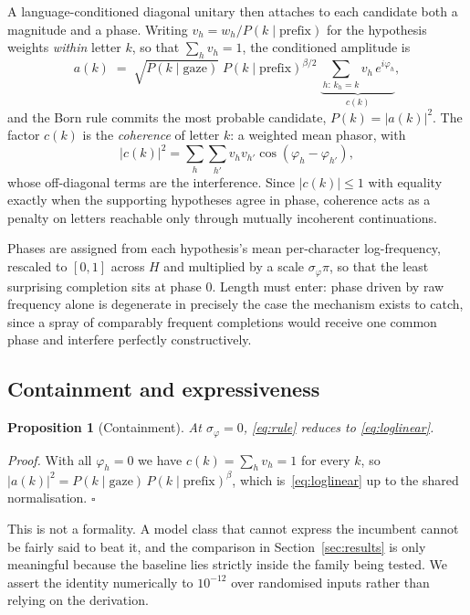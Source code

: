 \documentclass[conference]{IEEEtran}
\newtheorem{proposition}{Proposition}
\begin{document}
A language-conditioned diagonal unitary then attaches to each candidate both a
magnitude and a phase. Writing $v_h = w_h / P(k \mid \text{prefix})$ for the
hypothesis weights \emph{within} letter $k$, so that $\sum_h v_h = 1$, the
conditioned amplitude is
\begin{equation}
a(k) \;=\; \sqrt{P(k \mid \text{gaze})}\;
           P(k \mid \text{prefix})^{\beta/2}\;
           \underbrace{\sum_{h:\,k_h = k} v_h\, e^{i\varphi_h}}_{c(k)} ,
\label{eq:rule}
\end{equation}
and the Born rule commits the most probable candidate, $P(k) = \lvert a(k)
\rvert^{2}$. The factor $c(k)$ is the \emph{coherence} of letter $k$: a weighted
mean phasor, with
\begin{equation}
\lvert c(k) \rvert^{2}
  = \sum_{h}\sum_{h'} v_h v_{h'} \cos(\varphi_h - \varphi_{h'}) ,
\label{eq:interference}
\end{equation}
whose off-diagonal terms are the interference. Since $\lvert c(k)\rvert \le 1$
with equality exactly when the supporting hypotheses agree in phase, coherence
acts as a penalty on letters reachable only through mutually incoherent
continuations.

Phases are assigned from each hypothesis's mean per-character log-frequency,
rescaled to $[0,1]$ across $H$ and multiplied by a scale $\sigma_\varphi \pi$, so
that the least surprising completion sits at phase $0$. Length must enter:
phase driven by raw frequency alone is degenerate in precisely the case the
mechanism exists to catch, since a spray of comparably frequent completions
would receive one common phase and interfere perfectly constructively.

\subsection{Containment and expressiveness}

\begin{proposition}[Containment]
\label{prop:contain}
At $\sigma_\varphi = 0$, \eqref{eq:rule} reduces to \eqref{eq:loglinear}.
\end{proposition}

\noindent\emph{Proof.} With all $\varphi_h = 0$ we have $c(k) = \sum_h v_h = 1$
for every $k$, so $\lvert a(k)\rvert^{2} = P(k\mid\text{gaze})\,
P(k\mid\text{prefix})^{\beta}$, which is~\eqref{eq:loglinear} up to the shared
normalisation. $\square$

This is not a formality. A model class that cannot express the incumbent cannot
be fairly said to beat it, and the comparison in Section~\ref{sec:results} is
only meaningful because the baseline lies strictly inside the family being
tested. We assert the identity numerically to $10^{-12}$ over randomised inputs
rather than relying on the derivation.
\end{document}
